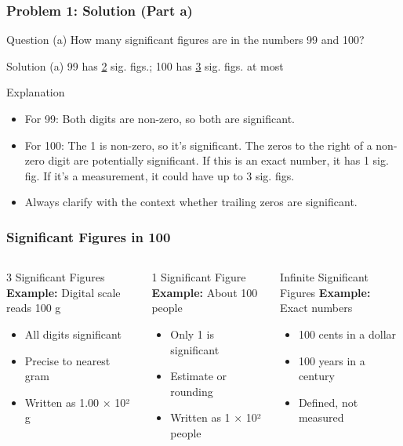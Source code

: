 \documentclass{beamer}
\begin{document}
\begin{frame}
\frametitle{Problem 1: Solution (Part a)}
\begin{block}{Question}
(a) How many significant figures are in the numbers 99 and 100?\\
\end{block}
\begin{block}{Solution}
(a) 99 has \underline{2} sig. figs.; 100 has \underline{3} sig. figs. at most
\end{block}
\begin{block}{Explanation}
\begin{itemize}
\item For 99: Both digits are non-zero, so both are significant.
\item For 100: The 1 is non-zero, so it's significant. The zeros to the right of a non-zero digit are potentially significant. If this is an exact number, it has 1 sig. fig. If it's a measurement, it could have up to 3 sig. figs.
\item Always clarify with the context whether trailing zeros are significant.
\end{itemize}
\end{block}
\end{frame}
\begin{frame}
\frametitle{Significant Figures in 100}

\begin{columns}[T]
\begin{exampleblock}{3 Significant Figures}
\textbf{Example:} Digital scale reads 100 g
\begin{itemize}
\item All digits significant
\item Precise to nearest gram
\item Written as 1.00 × 10² g
\end{itemize}
\end{exampleblock}

\begin{exampleblock}{1 Significant Figure}
\textbf{Example:} About 100 people
\begin{itemize}
\item Only 1 is significant
\item Estimate or rounding
\item Written as 1 × 10² people
\end{itemize}
\end{exampleblock}

\begin{exampleblock}{Infinite Significant Figures}
\textbf{Example:} Exact numbers
\begin{itemize}
\item 100 cents in a dollar
\item 100 years in a century
\item Defined, not measured
\end{itemize}
\end{exampleblock}
\end{columns}
\end{frame}
\end{document}
